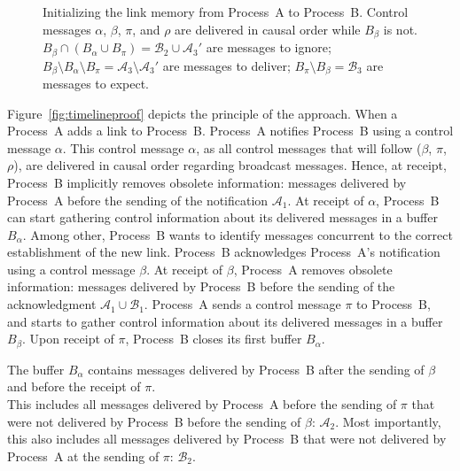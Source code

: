 \begin{figure}
  \begin{center}
    
    \caption{\label{fig:timelineproof}\label{fig:timeline}Initializing the link
      memory from Process~A to Process~B. Control messages $\alpha$, $\beta$,
      $\pi$, and $\rho$ are delivered in causal order while $B_\beta$ is not.
      $B_\beta \cap (B_\alpha \cup B_\pi) = \mathcal{B}_2 \cup \mathcal{A}_3'$
      are messages to ignore;
      $B_\beta \setminus B_\alpha \setminus B_\pi = \mathcal{A}_3\setminus
      \mathcal{A}_3'$
      are messages to deliver; $B_\pi \setminus B_\beta = \mathcal{B}_3$ are
      messages to expect.}
  \end{center}
\end{figure}


Figure~\ref{fig:timelineproof} depicts the principle of the approach. When a
Process~A adds a link to
Process~B. %
Process~A notifies Process~B using a control message $\alpha$. This control
message $\alpha$, as all control messages that will follow ($\beta$, $\pi$,
$\rho$), are delivered in causal order regarding broadcast messages. Hence, at
receipt, Process~B implicitly removes obsolete information: messages delivered
by Process~A before the sending of the notification $\mathcal{A}_1$. At receipt
of $\alpha$, Process~B can start gathering control information about its
delivered messages in a buffer $B_\alpha$. Among other, Process~B wants to
identify messages concurrent to the correct establishment of the new
link. Process~B acknowledges Process~A's notification using a control message
$\beta$. At receipt of $\beta$, Process~A removes obsolete information: messages
delivered by Process~B before the sending of the acknowledgment
$\mathcal{A}_1 \cup \mathcal{B}_1$. Process~A sends a control message $\pi$ to
Process~B, and starts to gather control information about its delivered messages
in a buffer $B_\beta$. Upon receipt of $\pi$, Process~B closes its first buffer
$B_\alpha$.
  
\begin{lemma}
  The buffer $B_\alpha$ contains messages delivered by Process~B after the
  sending of $\beta$ and before the receipt of $\pi$.\\
  This includes all messages delivered by Process~A before the sending of $\pi$
  that were not delivered by Process~B before the sending of $\beta$:
  $\mathcal{A}_2$. Most importantly, this also includes all messages delivered
  by Process~B that were not delivered by Process~A at the sending of $\pi$:
  $\mathcal{B}_2$.
\end{lemma}

